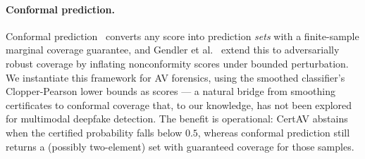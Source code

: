 \paragraph{Conformal prediction.}
Conformal prediction~\cite{angelopoulos2023conformal,romano2020classification} converts any score into prediction \emph{sets} with a finite-sample marginal coverage guarantee, and Gendler et al.~\cite{gendler2022adversarially} extend this to adversarially robust coverage by inflating nonconformity scores under bounded perturbation. We instantiate this framework for AV forensics, using the smoothed classifier's Clopper-Pearson lower bounds as scores --- a natural bridge from smoothing certificates to conformal coverage that, to our knowledge, has not been explored for multimodal deepfake detection. The benefit is operational: CertAV abstains when the certified probability falls below $0.5$, whereas conformal prediction still returns a (possibly two-element) set with guaranteed coverage for those samples.

